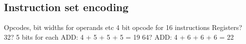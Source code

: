 \documentclass[10pt]{article}
\begin{document}
{    \subsection{Instruction set encoding}

    Opcodes, bit widths for operands etc
    4 bit opcode for 16 instructions
    Registers? 32? 5 bits for each
    ADD: 4 + 5 + 5 + 5 = 19
    64? ADD: 4 + 6 + 6 + 6 = 22
}
\end{document}
